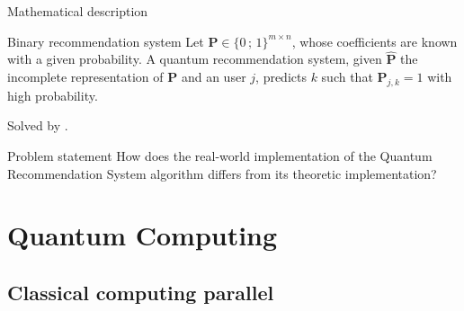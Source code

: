 \documentclass{beamer}
\begin{document}
\begin{frame}{Mathematical description}
    \begin{block}{Binary recommendation system}
        Let $\mathbf{P}\in\{0\,;\,1\}^{m\times n}$, whose coefficients are known with a given probability. A quantum recommendation system, given $\hat{\mathbf{P}}$ the incomplete representation of $\mathbf{P}$ and an user $j$, predicts $k$ such that $\mathbf{P}_{j,k}=1$ with high probability.
    \end{block}\pause
    Solved by \citeauthor{QRS}.\pause\pause
    
    \begin{block}{Problem statement}
        How does the real-world implementation of the Quantum Recommendation System algorithm differs from its theoretic implementation?
    \end{block}
\end{frame}

\section{Quantum Computing}
\subsection{Classical computing parallel}
\end{document}
